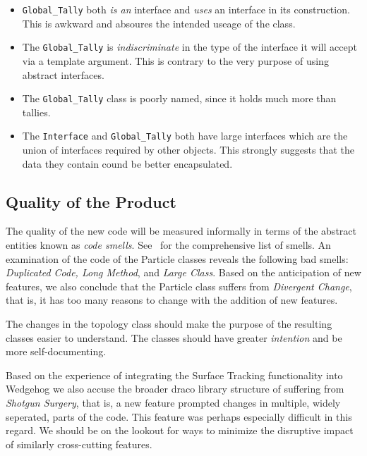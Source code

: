 \documentclass[11pt]{nmemo}
\begin{document}
\begin{itemize}
\item {\tt Global\_Tally} both {\em is an} interface and {\em uses} an
  interface in its construction. This is awkward and absoures the
  intended useage of the class.

\item The {\tt Global\_Tally} is {\em indiscriminate} in the type of the
interface it will accept via a template argument. This is contrary to
the very purpose of using abstract interfaces.

\item The {\tt Global\_Tally} class is poorly named, since it holds much
more than tallies.

\item The {\tt Interface} and {\tt Global\_Tally} both have large
  interfaces which are the union of interfaces required by other
  objects. This strongly suggests that the data they contain cound be
  better encapsulated.

\end{itemize}

\subsection*{Quality of the Product}

The quality of the new code will be measured informally in terms of
the abstract entities known as {\em code smells}. See~\cite[Chapter
3]{fowler00} for the comprehensive list of smells. An examination of
the code of the Particle classes reveals the following bad smells:
{\em Duplicated Code, Long Method}, and {\em Large Class}.  Based on
the anticipation of new features, we also conclude that the Particle
class suffers from {\em Divergent Change}, that is, it has too many
reasons to change with the addition of new features. 

The changes in the topology class should make the purpose of the
resulting classes easier to understand. The classes should have
greater {\em intention} and be more self-documenting.

Based on the experience of integrating the Surface Tracking
functionality into Wedgehog we also accuse the broader draco library
structure of suffering from {\em Shotgun Surgery}, that is, a new
feature prompted changes in multiple, widely seperated, parts of the
code. This feature was perhaps especially difficult in this regard. We
should be on the lookout for ways to minimize the disruptive impact of
similarly cross-cutting features.
\end{document}
